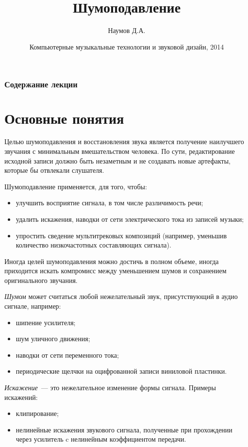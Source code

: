 \documentclass{beamer}
\title{Шумоподавление}
\author{Наумов Д.А.}
\date[12.03.2014] {Компьютерные музыкальные технологии и звуковой дизайн, 2014}
\begin{document}
\begin{frame}
  \titlepage
\end{frame}

\begin{frame}
  \frametitle{Содержание лекции}
  \tableofcontents
\end{frame}

\section{Основные понятия}
\begin{frame}
Целью шумоподавления и восстановления звука является получение наилучшего звучания с минимальным вмешательством человека. По сути, редактирование исходной записи должно быть незаметным и не создавать новые артефакты, которые бы отвлекали слушателя.

Шумоподавление применяется, для того, чтобы:
\begin{itemize}
  \item улучшить восприятие сигнала, в том числе различимость речи;
  \item удалить искажения, наводки от сети электрического тока из записей музыки;
  \item упростить сведение мультитрековых композиций (например, уменьшив количество низкочастотных составляющих сигнала).
\end{itemize}

Иногда целей шумоподавления можно достичь в полном объеме, иногда приходится искать компромисс между уменьшением шумов и сохранением оригинального звучания.
\end{frame}

\begin{frame}
\textit{Шумом} может считаться любой нежелательный звук, присутствующий в аудио сигнале, например:
\begin{itemize}
\item шипение усилителя;
\item шум уличного движения;
\item наводки от сети переменного тока;
\item периодические щелчки на оцифрованной записи виниловой пластинки.
\end{itemize}

\textit{Искажение}~--– это нежелательное изменение формы сигнала. Примеры искажений:
\begin{itemize}
\item клипирование;
\item нелинейные искажения звукового сигнала, полученные при прохождении через усилитель c нелинейным коэффициентом передачи.
\end{itemize}
\end{frame}
\end{document}
